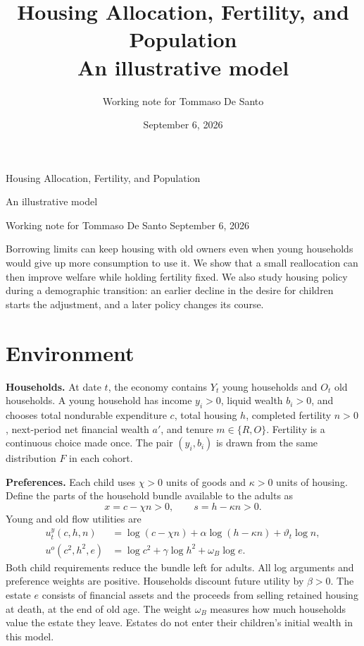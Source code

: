 \documentclass[11pt]{article}
\title{Housing Allocation, Fertility, and Population\\\large An illustrative model}
\author{Working note for Tommaso De Santo}
\date{September 6, 2026}
\begin{document}
\begin{center}
{\Large Housing Allocation, Fertility, and Population}\par
\smallskip
{\large An illustrative model}\par
\smallskip
{\small Working note for Tommaso De Santo \quad September 6, 2026}
\end{center}
\medskip

Borrowing limits can keep housing with old owners even when young households
would give up more consumption to use it. We show that a small reallocation
can then improve welfare while holding fertility fixed. We also study housing
policy during a demographic transition: an earlier decline in the desire for
children starts the adjustment, and a later policy changes its course.

\section{Environment}

\textbf{Households.}
At date $t$, the economy contains $Y_t$ young households and $O_t$ old
households. A young household has income $y_i>0$, liquid wealth $b_i>0$, and
chooses total nondurable expenditure $c$, total housing $h$, completed
fertility $n>0$, next-period net financial wealth $a'$, and tenure $m\in\{R,O\}$. Fertility is a
continuous choice made once. The pair $(y_i,b_i)$ is drawn from the same
distribution $F$ in each cohort.

\textbf{Preferences.}
Each child uses $\chi>0$ units of goods and $\kappa>0$ units of housing. Define
the parts of the household bundle available to the adults as
\begin{equation}
 x=c-\chi n>0,\qquad s=h-\kappa n>0.
 \label{eq:amend_usable_bundles}
\end{equation}
Young and old flow utilities are
\begin{align}
 u_t^y(c,h,n)&=\log(c-\chi n)+\alpha\log(h-\kappa n)
 +\vartheta_t\log n,
 \label{eq:amend_preferences}\\
 u^o(c^2,h^2,e)&=\log c^2+\gamma\log h^2+\omega_B\log e.
 \label{eq:amend_old_preferences}
\end{align}
Both child requirements reduce the bundle left for adults. All log arguments
and preference weights are positive. Households discount future utility by $\beta>0$.
The estate $e$ consists of financial assets and the proceeds from selling
retained housing at death, at the end of old age. The weight $\omega_B$
measures how much households value the estate they leave. Estates do not
enter their children's initial wealth in this model.
\end{document}
